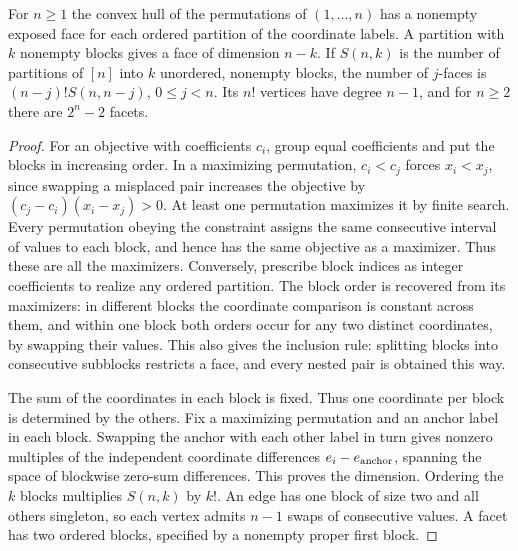 \begin{theorem}[Permutohedron]\label{result56}
For \(n\ge1\) the convex hull of the permutations of \((1,\ldots,n)\)
has a nonempty exposed face for each ordered partition of the coordinate
labels. A partition with \(k\) nonempty blocks gives a face of dimension
\(n-k\). If \(S(n,k)\) is the number of partitions of \([n]\) into
\(k\) unordered, nonempty blocks, the number of \(j\)-faces is
\((n-j)! S(n,n-j)\), \(0\le j<n\). Its \(n!\) vertices have degree
\(n-1\), and for \(n\ge2\) there are \(2^n-2\) facets.
\end{theorem}
\begin{proof}
For an objective with coefficients \(c_i\), group equal coefficients
and put the blocks in increasing order. In a maximizing permutation,
\(c_i<c_j\) forces \(x_i<x_j\), since swapping a misplaced pair
increases the objective by \((c_j-c_i)(x_i-x_j)>0\). At least one
permutation maximizes it by finite search. Every permutation obeying
the constraint assigns the same consecutive interval of values to
each block, and hence has the same objective as a maximizer. Thus these
are all the maximizers. Conversely, prescribe block indices as integer
coefficients to realize any ordered partition. The block order is
recovered from its maximizers: in different blocks the coordinate
comparison is constant across them, and within one block both orders
occur for any two distinct coordinates, by swapping their values.
This also gives the inclusion rule: splitting blocks into consecutive
subblocks restricts a face, and every nested pair is obtained this way.

The sum of the coordinates in each block is fixed. Thus one coordinate
per block is determined by the others. Fix a maximizing permutation and
an anchor label in each block. Swapping the anchor with each other label
in turn gives nonzero multiples of the independent coordinate differences
\(e_i-e_{\rm anchor}\), spanning the space of blockwise zero-sum
differences. This proves the dimension. Ordering the \(k\) blocks
multiplies \(S(n,k)\) by \(k!\). An edge has one block of size two and
all others singleton, so each vertex admits \(n-1\) swaps of consecutive
values. A facet has two ordered blocks, specified by a nonempty proper
first block.
\end{proof}

